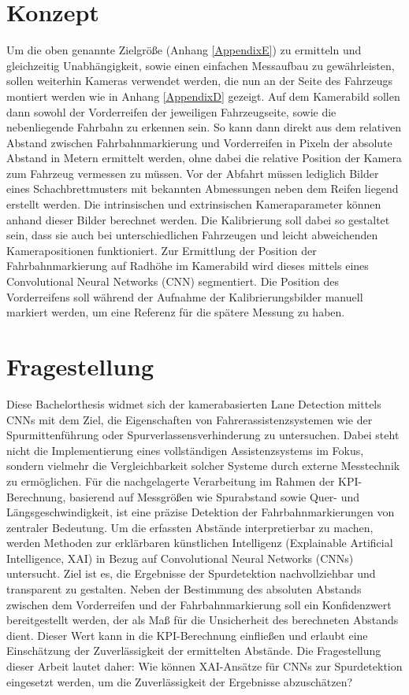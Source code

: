 \section{Konzept}
\label{konzept}
Um die oben genannte Zielgrö{\ss}e  (Anhang \ref{AppendixE}) zu ermitteln und gleichzeitig Unabhängigkeit, sowie einen einfachen Messaufbau zu gewährleisten, sollen weiterhin Kameras verwendet werden, die nun an der Seite des Fahrzeugs montiert werden wie in Anhang \ref{AppendixD} gezeigt. Auf dem Kamerabild sollen dann sowohl der Vorderreifen der jeweiligen Fahrzeugseite, sowie die nebenliegende Fahrbahn zu erkennen sein. 
So kann dann direkt aus dem relativen Abstand zwischen Fahrbahnmarkierung und Vorderreifen in Pixeln der absolute Abstand in Metern ermittelt werden, ohne dabei die relative Position der Kamera zum Fahrzeug vermessen zu müssen. Vor der Abfahrt müssen lediglich Bilder eines Schachbrettmusters mit bekannten Abmessungen neben dem Reifen liegend erstellt werden.
Die intrinsischen und extrinsischen Kameraparameter können anhand dieser Bilder berechnet werden.
Die Kalibrierung soll dabei so gestaltet sein, dass sie auch bei unterschiedlichen Fahrzeugen und leicht abweichenden Kamerapositionen funktioniert.
Zur Ermittlung der Position der Fahrbahnmarkierung auf Radhöhe im Kamerabild wird dieses mittels eines Convolutional Neural Networks (CNN) segmentiert. Die Position des Vorderreifens soll während der Aufnahme der Kalibrierungsbilder manuell markiert werden, um eine Referenz für die spätere Messung zu haben. 

\section{Fragestellung}
Diese Bachelorthesis widmet sich der kamerabasierten Lane Detection mittels CNNs mit dem Ziel, die Eigenschaften von Fahrerassistenzsystemen wie der Spurmittenführung oder Spurverlassensverhinderung zu untersuchen. Dabei steht nicht die Implementierung eines vollständigen Assistenzsystems im Fokus, sondern vielmehr die Vergleichbarkeit solcher Systeme durch externe Messtechnik zu ermöglichen.
Für die nachgelagerte Verarbeitung im Rahmen der KPI-Berechnung, basierend auf Messgrö{\ss}en wie Spurabstand sowie Quer- und Längsgeschwindigkeit, ist eine präzise Detektion der Fahrbahnmarkierungen von zentraler Bedeutung. Um die erfassten Abstände interpretierbar zu machen, werden Methoden zur erklärbaren künstlichen Intelligenz (Explainable Artificial Intelligence, XAI) in Bezug auf Convolutional Neural Networks (CNNs) untersucht. Ziel ist es, die Ergebnisse der Spurdetektion nachvollziehbar und transparent zu gestalten. Neben der Bestimmung des absoluten Abstands zwischen dem Vorderreifen und der Fahrbahnmarkierung soll ein Konfidenzwert bereitgestellt werden, der als Ma{\ss} für die Unsicherheit des berechneten Abstands dient. Dieser Wert kann in die KPI-Berechnung einflie{\ss}en und erlaubt eine Einschätzung der Zuverlässigkeit der ermittelten Abstände.
Die Fragestellung dieser Arbeit lautet daher: Wie können XAI-Ansätze für CNNs zur Spurdetektion eingesetzt werden, um die Zuverlässigkeit der Ergebnisse abzuschätzen?